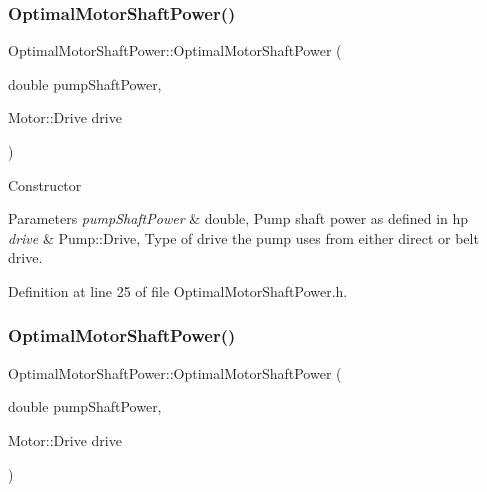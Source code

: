 \subsubsection{\texorpdfstring{Optimal\+Motor\+Shaft\+Power()}{OptimalMotorShaftPower()}\hspace{0.1cm}{\footnotesize\ttfamily [2/3]}}
{\footnotesize\ttfamily Optimal\+Motor\+Shaft\+Power\+::\+Optimal\+Motor\+Shaft\+Power (\begin{DoxyParamCaption}\item[{double}]{pump\+Shaft\+Power,  }\item[{Motor\+::\+Drive}]{drive }\end{DoxyParamCaption})\hspace{0.3cm}{\ttfamily [inline]}}

Constructor 
\begin{DoxyParams}{Parameters}
{\em pump\+Shaft\+Power} & double, Pump shaft power as defined in hp \\
\hline
{\em drive} & Pump\+::\+Drive, Type of drive the pump uses from either direct or belt drive. \\
\hline
\end{DoxyParams}


Definition at line 25 of file Optimal\+Motor\+Shaft\+Power.\+h.

\mbox{\label{class_optimal_motor_shaft_power_af0981673204c5f8a8cae26a8be8a8a5c}} 
\subsubsection{\texorpdfstring{Optimal\+Motor\+Shaft\+Power()}{OptimalMotorShaftPower()}\hspace{0.1cm}{\footnotesize\ttfamily [3/3]}}
{\footnotesize\ttfamily Optimal\+Motor\+Shaft\+Power\+::\+Optimal\+Motor\+Shaft\+Power (\begin{DoxyParamCaption}\item[{double}]{pump\+Shaft\+Power,  }\item[{Motor\+::\+Drive}]{drive }\end{DoxyParamCaption})\hspace{0.3cm}{\ttfamily [inline]}}

